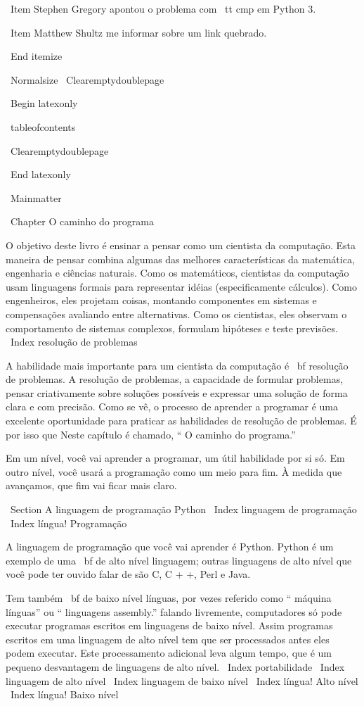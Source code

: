 \documentclass[10pt]{book}
\begin{document}
\begin {itemize}
\ Item Stephen Gregory apontou o problema com {\ tt cmp}
em Python 3.

\ Item Matthew Shultz me informar sobre um link quebrado.


\ End {itemize}

\ Normalsize
\ Clearemptydoublepage

\ Begin {latexonly}

\ tableofcontents

\ Clearemptydoublepage

\ End {latexonly}

\ Mainmatter

\ Chapter {O caminho do programa}

O objetivo deste livro é ensinar a pensar como um
cientista da computação. Esta maneira de pensar combina algumas das melhores características
da matemática, engenharia e ciências naturais. Como os matemáticos,
cientistas da computação usam linguagens formais para representar idéias (especificamente
cálculos). Como engenheiros, eles projetam coisas, montando componentes
em sistemas e compensações avaliando entre alternativas. Como os cientistas,
eles observam o comportamento de sistemas complexos, formulam hipóteses e teste
previsões.
\ Index {} resolução de problemas

A habilidade mais importante para um cientista da computação é {\ bf
resolução de problemas}. A resolução de problemas, a capacidade de formular
problemas, pensar criativamente sobre soluções possíveis e expressar uma solução de forma clara
e com precisão. Como se vê, o processo de aprender a programar é uma
excelente oportunidade para praticar as habilidades de resolução de problemas. É por isso que
Neste capítulo é chamado, `` O caminho do programa.''

Em um nível, você vai aprender a programar, um útil
habilidade por si só. Em outro nível, você usará a programação como um meio para
fim. À medida que avançamos, que fim vai ficar mais claro.

\ Section {A linguagem de programação Python}
\ Index {linguagem de programação}
\ Index {língua! Programação}

A linguagem de programação que você vai aprender é Python. Python é
um exemplo de uma {\ bf de alto nível linguagem}; outras linguagens de alto nível
que você pode ter ouvido falar de são C, C + +, Perl e Java.

Tem
também {\ bf de baixo nível línguas}, por vezes referido como `` máquina
línguas'' ou `` linguagens assembly.'' falando livremente, computadores
só pode executar programas escritos em linguagens de baixo nível. Assim
programas escritos em uma linguagem de alto nível tem que ser processados ​​antes
eles podem executar. Este processamento adicional leva algum tempo, que é um pequeno
desvantagem de linguagens de alto nível.
\ Index {} portabilidade
\ Index {linguagem de alto nível}
\ Index {linguagem de baixo nível}
\ Index {língua! Alto nível}
\ Index {língua! Baixo nível}


\end{itemize}
\end{document}
